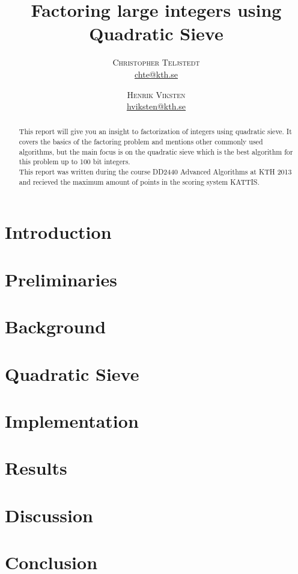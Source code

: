 \documentclass[twoside,11pt,english]{article}
\title{\vspace{-15mm}%
	\fontsize{24pt}{10pt}\selectfont
	\textbf{Factoring large integers using Quadratic Sieve}
	}
\author{%
	\large
	\textsc{Christopher Teljstedt} \\[2mm]
	\normalsize	\href{mailto:chte@kth.se}{chte@kth.se} 
	\and
	\textsc{Henrik Viksten} \\[2mm]
	\normalsize	\href{mailto:hviksten@kth.se}{hviksten@kth.se}
	}
\begin{document}
\maketitle
\thispagestyle{fancy}
\begin{abstract}

\noindent This report will give you an insight to factorization of integers using quadratic sieve. It covers the basics of the factoring problem and mentions other commonly used algorithms, but the main focus is on the quadratic sieve which is the best algorithm for this problem up to 100 bit integers. \\
This report was written during the course DD2440 Advanced Algorithms at KTH 2013 and recieved the maximum amount of points in the scoring system KATTIS.

\end{abstract}
\newpage

\tableofcontents
\newpage

\begin{multicols}{2}
\section{Introduction}

\section{Preliminaries}

\section{Background}

\section{Quadratic Sieve}

\section{Implementation}

\section{Results}

\section{Discussion}

\section{Conclusion}


\newpage



\end{multicols}
\end{document}
